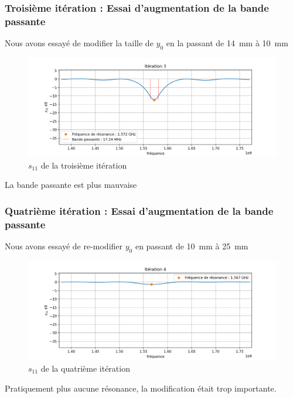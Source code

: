\documentclass[Deriaz_Traiber_Labo02.tex]{subfiles}
\begin{document}
\subsubsection{Troisième itération : Essai d'augmentation de la bande passante}
Nous avons essayé de modifier la taille de $y_0$ en la passant de \SI{14}{\milli\meter} à \SI{10}{\milli\meter}
\begin{figure}[H]
\centering
\includegraphics[width=15cm]{../Calculs/run_id_fr4_3.png}
\caption[caption]{$s_{11}$ de la troisième itération}
\end{figure}
La bande passante est plus mauvaise
\subsubsection{Quatrième itération : Essai d'augmentation de la bande passante}
Nous avons essayé de re-modifier $y_0$ en passant de \SI{10}{\milli\meter} à \SI{25}{\milli\meter}
\begin{figure}[H]
\centering
\includegraphics[width=15cm]{../Calculs/run_id_fr4_4.png}
\caption[caption]{$s_{11}$ de la quatrième itération}
\end{figure}
Pratiquement plus aucune résonance, la modification était trop importante.
\end{document}
